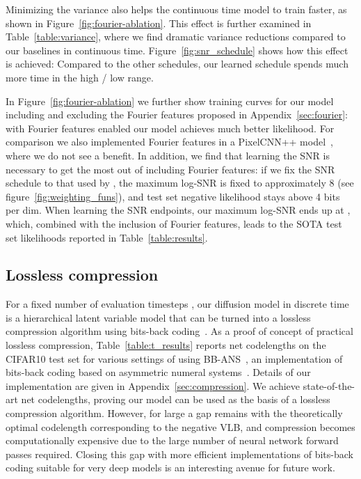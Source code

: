 \documentclass{article}
\begin{document}
Minimizing the variance also helps the continuous time model to train faster, as shown in Figure~\ref{fig:fourier-ablation}. This effect is further examined in Table~\ref{table:variance}, where we find dramatic variance reductions compared to our baselines in continuous time. Figure~\ref{fig:snr_schedule} shows how this effect is achieved: Compared to the other schedules, our learned schedule spends much more time in the high  / low  range.




In Figure~\ref{fig:fourier-ablation} we further show training curves for our model including and excluding the Fourier features proposed in Appendix~\ref{sec:fourier}: with Fourier features enabled our model achieves much better likelihood. For comparison we also implemented Fourier features in a PixelCNN++ model~\citep{salimans2017pixelcnn++}, where we do not see a benefit. In addition, we find that learning the SNR is necessary to get the most out of including Fourier features: if we fix the SNR schedule to that used by \cite{ho2020denoising}, the maximum log-SNR is fixed to approximately 8 (see figure~\ref{fig:weighting_funs}), and test set negative likelihood stays above 4 bits per dim. When learning the SNR endpoints, our maximum log-SNR ends up at , which, combined with the inclusion of Fourier features, leads to the SOTA test set likelihoods reported in Table~\ref{table:results}.

\subsection{Lossless compression}
For a fixed number of evaluation timesteps , our diffusion model in discrete time is a hierarchical latent variable model that can be turned into a lossless compression algorithm using bits-back coding~\citep{hinton1993keeping}. 
As a proof of concept of practical lossless compression, Table~\ref{table:t_results} reports net codelengths on the CIFAR10 test set for various settings of  using BB-ANS~\citep{townsend2018practical}, an implementation of bits-back coding based on asymmetric numeral systems~\citep{duda2009asymmetric}. Details of our implementation are given in Appendix~\ref{sec:compression}. We achieve state-of-the-art net codelengths, proving our model can be used as the basis of a lossless compression algorithm. However, for large  a gap remains with the theoretically optimal codelength corresponding to the negative VLB, and compression becomes computationally expensive due to the large number of neural network forward passes required. Closing this gap with more efficient implementations of bits-back coding suitable for very deep models is an interesting avenue for future work.
\end{document}
